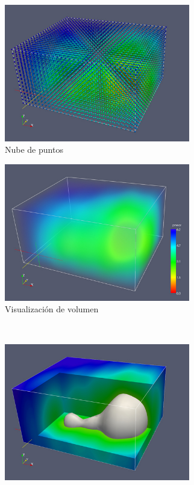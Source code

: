 \begin{figure}[t]
	\centering
	\begin{subfigure}[b]{.45\textwidth}
			\includegraphics[height=6cm,width=\textwidth]{figures/pointcloud.jpg}
			\caption{Nube de puntos}
			\label{fig:pointcloud}
	\end{subfigure} \hfill
	\begin{subfigure}[b]{.45\textwidth}
			\includegraphics[height=6cm,width=\textwidth]{figures/volumevisualization.jpg}
			\caption{Visualización de volumen}
			\label{fig:volumevisualization}
	\end{subfigure}
	\newline \\
	\begin{subfigure}[b]{.45\textwidth}
			\includegraphics[height=6cm,width=\textwidth]{figures/isosurface.jpg}

\end{subfigure}
\end{figure}
